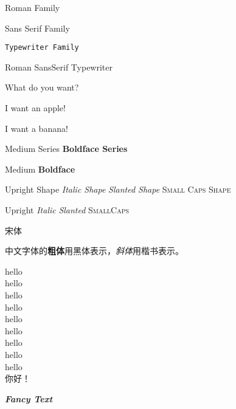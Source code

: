 \documentclass[10pt]{article}
\newcommand{\myfont}{\textbf{\textsf{\textit{Fancy Text}}}}
\begin{document}
	\textrm{Roman Family}
	
	\textsf{Sans Serif Family}
	
	\texttt{Typewriter Family}
	
	{\rmfamily Roman } 	{\sffamily SansSerif }  	{\ttfamily Typewriter }
	
	{\rmfamily What do you want?}
	
	{\sffamily I want an apple!}
	
	{\ttfamily I want a banana!}
	
	\textmd{Medium Series}	
	\textbf{Boldface Series}
	
	{\mdseries Medium}	{\bfseries Boldface}
	
	\textup{Upright Shape}	\textit{Italic Shape}
	\textsl{Slanted Shape}	\textsc{Small Caps Shape}
	
	{\upshape Upright}  {\itshape Italic}	{\slshape Slanted} {\scshape SmallCaps}
	
	{\songti 宋体}   
	
	中文字体的\textbf{粗体}用黑体表示，\textit{斜体}用楷书表示。
	
	{\tiny 			hello}\\%
	{\scriptsize 	hello}\\
	{\footnotesize  hello}\\
	{\small 		hello}\\
	{\normalsize 	hello}\\
	{\large 		hello}\\
	{\LARGE 		hello}\\
	{\huge 			hello}\\
	{\Huge		 	hello}\\
	
	 你好！
	
	\myfont
\end{document}

